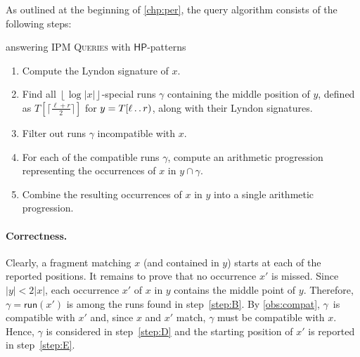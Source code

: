 \documentclass[a4paper]{article}
\theoremstyle{definition}
\theoremstyle{remark}
\newcommand{\IPM}{\textsc{IPM Queries}\xspace}
\newcommand{\HP}{\mathsf{HP}}
\newcommand{\floor}[1]{\left\lfloor #1 \right\rfloor}
\newcommand{\dd}{\mathinner{\ldotp\ldotp}}
\newcommand{\run}{\mathsf{run}}
\begin{document}
As outlined at the beginning of \cref{chp:per}, the query algorithm consists of the following steps:

\begin{center}
\begin{minipage}{14cm}
 answering \IPM with $\HP$-patterns

  \begin{enumerate}[label=(\Alph*)]
    \item\label{step:A} Compute the Lyndon signature of $x$.
    \item\label{step:B} Find all $\floor{\log |x|}$-special runs $\gamma$ containing the middle position of $y$,
      defined as $T[\lceil{\frac{\ell+r}{2}}\rceil]$ for $y=T[\ell\dd r)$, along with their Lyndon signatures.
    \item\label{step:C} Filter out runs $\gamma$ incompatible with $x$.
    \item\label{step:D}
	  For each of the compatible runs $\gamma$, compute an arithmetic progression representing the occurrences of $x$ in $y\cap \gamma$.
	  \item\label{step:E}
      Combine the resulting occurrences of $x$ in $y$ into a single arithmetic progression.
  \end{enumerate}
  \end{minipage}
\end{center}

\paragraph*{Correctness.} Clearly, a fragment matching $x$ (and contained in $y$) starts at each of the reported positions. 
It remains to prove that no occurrence $x'$ is missed.
Since $|y|<2|x|$, each occurrence $x'$ of $x$ in $y$ contains the middle point of $y$.
Therefore, $\gamma=\run(x')$ is among the runs found in step~\ref{step:B}.
By \cref{obs:compat}, $\gamma$~is compatible with $x'$ and, since $x$ and $x'$ match, $\gamma$ must be compatible with $x$. Hence, $\gamma$ is considered in step~\ref{step:D} and the starting position of $x'$ is reported in step~\ref{step:E}.
\end{document}
